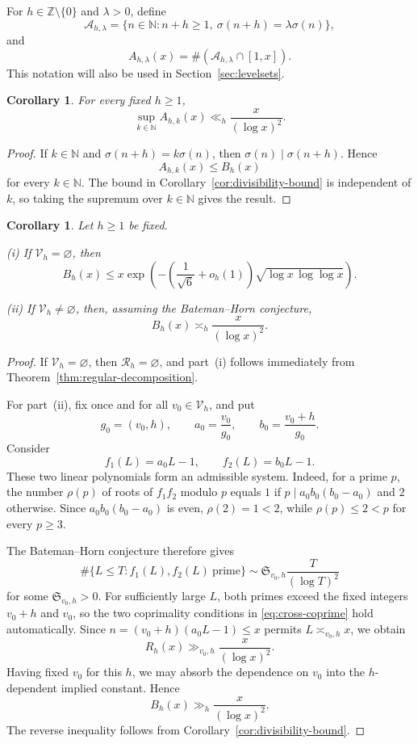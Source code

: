 \documentclass[11pt,reqno]{amsart}
\numberwithin{equation}{section}
\theoremstyle{plain}
\newtheorem{corollary}[theorem]{Corollary}
\theoremstyle{definition}
\theoremstyle{remark}
\newcommand{\N}{\mathbb N}
\newcommand{\Z}{\mathbb Z}
\begin{document}
For $h\in\Z\setminus\{0\}$ and $\lambda>0$, define
\[
\mathcal A_{h,\lambda}
=
\{n\in\N:n+h\ge1,\ \sigma(n+h)=\lambda\sigma(n)\},
\]
and
\[
A_{h,\lambda}(x)=\#(\mathcal A_{h,\lambda}\cap[1,x]).
\]
This notation will also be used in Section~\ref{sec:levelsets}.

\begin{corollary}\label{cor:integer-multiplier}
For every fixed $h\ge1$,
\[
\sup_{k\in\N}A_{h,k}(x)\ll_h\frac{x}{(\log x)^2}.
\]
\end{corollary}
\begin{proof}
If $k\in\N$ and $\sigma(n+h)=k\sigma(n)$, then $\sigma(n)\mid\sigma(n+h)$. Hence
\[
A_{h,k}(x)\le B_h(x)
\]
for every $k\in\N$. The bound in Corollary~\ref{cor:divisibility-bound} is independent of $k$, so taking the supremum over $k\in\N$ gives the result.
\end{proof}

\begin{corollary}\label{cor:dichotomy}
Let $h\ge1$ be fixed.

\textup{(i)} If $\mathcal V_h=\varnothing$, then
\[
B_h(x)
\le
x\exp\!\left(
-\left(\frac1{\sqrt6}+o_h(1)\right)
\sqrt{\log x\,\log\log x}
\right).
\]

\textup{(ii)} If $\mathcal V_h\ne\varnothing$, then, assuming the Bateman--Horn conjecture,
\[
B_h(x)\asymp_h\frac{x}{(\log x)^2}.
\]
\end{corollary}
\begin{proof}
If $\mathcal V_h=\varnothing$, then $\mathcal R_h=\varnothing$, and part~(i) follows immediately from Theorem~\ref{thm:regular-decomposition}.

For part~(ii), fix once and for all $v_0\in\mathcal V_h$, and put
\[
g_0=(v_0,h),\qquad a_0=\frac{v_0}{g_0},\qquad b_0=\frac{v_0+h}{g_0}.
\]
Consider
\[
f_1(L)=a_0L-1,\qquad f_2(L)=b_0L-1.
\]
These two linear polynomials form an admissible system. Indeed, for a prime $p$, the number $\rho(p)$ of roots of $f_1f_2$ modulo $p$ equals $1$ if $p\mid a_0b_0(b_0-a_0)$ and $2$ otherwise. Since $a_0b_0(b_0-a_0)$ is even, $\rho(2)=1<2$, while $\rho(p)\le2<p$ for every $p\ge3$.

The Bateman--Horn conjecture therefore gives
\[
\#\{L\le T:f_1(L),f_2(L)\ \text{prime}\}
\sim
\mathfrak S_{v_0,h}\frac{T}{(\log T)^2}
\]
for some $\mathfrak S_{v_0,h}>0$. For sufficiently large $L$, both primes exceed the fixed integers $v_0+h$ and $v_0$, so the two coprimality conditions in \eqref{eq:cross-coprime} hold automatically. Since $n=(v_0+h)(a_0L-1)\le x$ permits $L\asymp_{v_0,h}x$, we obtain
\[
R_h(x)\gg_{v_0,h}\frac{x}{(\log x)^2}.
\]
Having fixed $v_0$ for this $h$, we may absorb the dependence on $v_0$
into the $h$-dependent implied constant. Hence
\[
B_h(x)\gg_h\frac{x}{(\log x)^2}.
\]
The reverse inequality follows from Corollary~\ref{cor:divisibility-bound}.
\end{proof}
\end{document}
